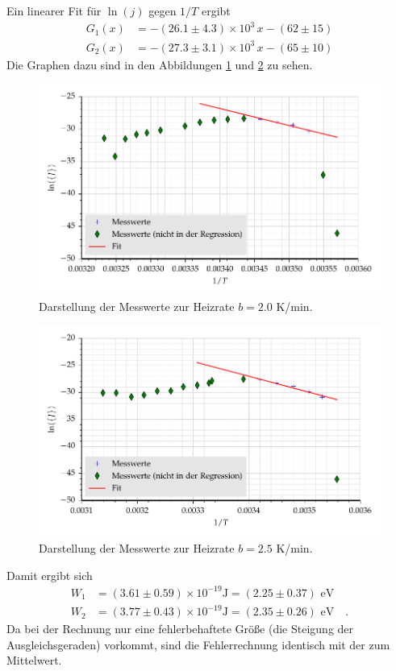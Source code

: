Ein linearer Fit für $\ln(j)$ gegen $1/T$ ergibt
%
%
\begin{align}
G_1(x)&= -( 26.1\pm 4.3)\times 10^{3} \,x - (62 \pm 15) \\
G_2(x)&= -(27.3 \pm 3.1 )\times 10^{3} \,x - (65 \pm 10)
\end{align}
Die Graphen dazu sind in den Abbildungen \ref{fig:G1} und \ref{fig:G2} zu sehen.

\begin{figure}[h]
\centering
\includegraphics[scale=0.8]{../skript/G1.pdf}
\caption{Darstellung der Messwerte zur Heizrate $b=2.0$ K/min.}
\label{fig:G1}
\end{figure}
\begin{figure}[h]
\centering
\includegraphics[scale=0.8]{../skript/G2.pdf}
\caption{Darstellung der Messwerte zur Heizrate $b=2.5$ K/min.}
\label{fig:G2}
\end{figure}



Damit ergibt sich
\begin{align}
W_1&= (3.61 \pm 0.59)\times 10^{-19}\text{J}=(2.25 \pm 0.37)\text{ eV}\\
W_2&=  (3.77 \pm 0.43) \times 10^{-19}\text{J}=(2.35 \pm 0.26)\text{ eV}\quad .
\end{align}
Da bei der Rechnung nur eine fehlerbehaftete Größe (die Steigung der
Ausgleichsgeraden) vorkommt, sind die Fehlerrechnung identisch mit der
zum Mittelwert.

